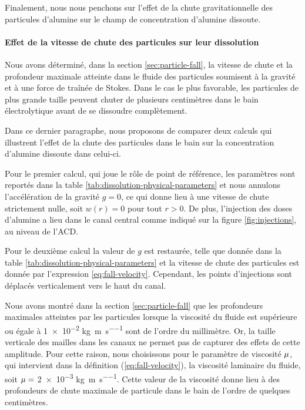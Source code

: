 Finalement, nous nous penchons sur l'effet de la chute
gravitationnelle des particules d'alumine sur le champ de
concentration d'alumine dissoute.

\paragraph{Effet de la vitesse de chute des particules sur leur
  dissolution}


Nous avons déterminé, dans la section \ref{sec:particle-fall}, la vitesse
de chute et la profondeur maximale atteinte dans le fluide des
particules soumisent à la gravité et à une force de traînée de
Stokes. Dans le cas le plus favorable, les particules de plus grande
taille peuvent chuter de plusieurs centimètres dans le bain
électrolytique avant de se dissoudre complètement.

Dans ce dernier paragraphe, nous proposons de comparer deux calculs
qui illustrent l'effet de la chute des particules dans le bain sur la
concentration d'alumine dissoute dans celui-ci.

Pour le premier calcul, qui joue le rôle de point de référence, les
paramètres sont reportés dans la table
\ref{tab:dissolution-physical-parameters} et nous annulons
l'accélération de la gravité $g = 0$, ce qui donne lieu à une vitesse
de chute strictement nulle, soit $w(r) = 0$ pour tout $r>0$. De plus,
l'injection des doses d'alumine a lieu dans le canal central comme
indiqué sur la figure \ref{fig:injections}, au niveau de l'ACD.

Pour le deuxième calcul la valeur de $g$ est restaurée, telle que
donnée dans la table \ref{tab:dissolution-physical-parameters} et la
vitesse de chute des particules est donnée par l'expression
\ref{eq:fall-velocity}. Cependant, les points d'injections sont
déplacés verticalement vers le haut du canal.

Nous avons montré dans la section \ref{sec:particle-fall} que les
profondeurs maximales atteintes par les particules lorsque la viscosité
du fluide est supérieure ou égale à \num{1e-2}
\si{\kilo\gram\per\meter\per\second} sont de l'ordre du
millimètre. Or, la taille verticale des mailles dans les canaux ne
permet pas de capturer des effets de cette amplitude. Pour cette
raison, nous choisissons pour le paramètre de viscosité
$\mu$, qui intervient dans la définition
(\ref{eq:fall-velocity}), la viscosité laminaire du fluide, soit
$\mu = $ \num{2e-3}
\si{\kilo\gram\per\meter\per\second}. Cette valeur de la viscosité
donne lieu à des profondeurs de chute maximale de particule dans le
bain de l'ordre de quelques centimètres.

